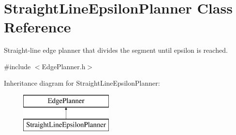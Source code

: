 \section{Straight\+Line\+Epsilon\+Planner Class Reference}
\label{classStraightLineEpsilonPlanner}


Straight-\/line edge planner that divides the segment until epsilon is reached.  




{\ttfamily \#include $<$Edge\+Planner.\+h$>$}

Inheritance diagram for Straight\+Line\+Epsilon\+Planner\+:\begin{figure}[H]
\begin{center}
\leavevmode
\includegraphics[height=2.000000cm]{classStraightLineEpsilonPlanner}
\end{center}
\end{figure}
